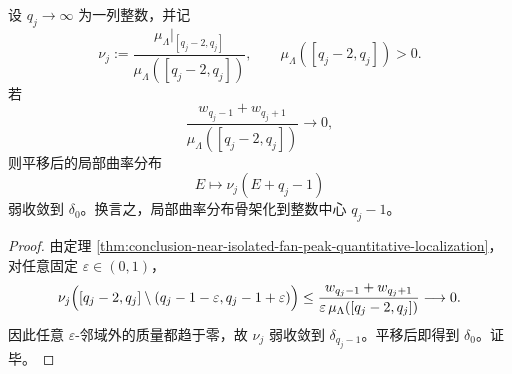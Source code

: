 \begin{corollary}[近孤立扇峰的弱骨架化]\label{cor:conclusion-near-isolated-fan-peak-weak-skeletonization}
设 \(q_j\to\infty\) 为一列整数，并记
\[
\nu_j:=
\frac{\mu_\Lambda|_{[q_j-2,q_j]}}{\mu_\Lambda([q_j-2,q_j])},
\qquad
\mu_\Lambda([q_j-2,q_j])>0.
\]
若
\[
\frac{w_{q_j-1}+w_{q_j+1}}{\mu_\Lambda([q_j-2,q_j])}\longrightarrow 0,
\]
则平移后的局部曲率分布
\[
E\longmapsto \nu_j(E+q_j-1)
\]
弱收敛到 \(\delta_0\)。换言之，局部曲率分布骨架化到整数中心 \(q_j-1\)。
\end{corollary}
\begin{proof}
由定理 \ref{thm:conclusion-near-isolated-fan-peak-quantitative-localization}，对任意固定 \(\varepsilon\in(0,1)\)，
\[
\nu_j\Bigl([q_j-2,q_j]\setminus(q_j-1-\varepsilon,q_j-1+\varepsilon)\Bigr)
\le
\frac{w_{q_j-1}+w_{q_j+1}}{\varepsilon\,\mu_\Lambda([q_j-2,q_j])}
\longrightarrow 0.
\]
因此任意 \(\varepsilon\)-邻域外的质量都趋于零，故 \(\nu_j\) 弱收敛到 \(\delta_{q_j-1}\)。平移后即得到 \(\delta_0\)。证毕。
\end{proof}
